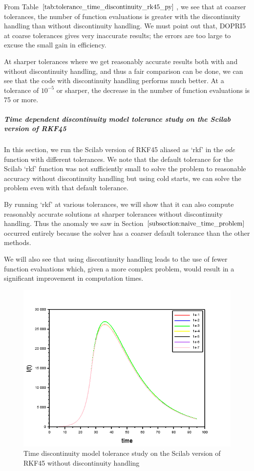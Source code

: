 From Table $\ref{tab:tolerance_time_discontinuity_rk45_py}$, we see that at coarser tolerances, the number of function evaluations is greater with the discontinuity handling than without discontinuity handling. We must point out that, DOPRI5 at coarse tolerances gives very inaccurate results; the errors are too large to excuse the small gain in efficiency.

At sharper tolerances where we get reasonably accurate results both with and without discontinuity handling, and thus a fair comparison can be done, we can see that the code with discontinuity handling performs much better. At a tolerance of $10^{-5}$ or sharper, the decrease in the number of function evaluations is 75 or more.

\subparagraph{Time dependent discontinuity model tolerance study on the Scilab version of RKF45}
In this section, we run the Scilab version of RKF45 aliased as `rkf' in the $ode$ function with different tolerances. We note that the default tolerance for the Scilab `rkf' function was not sufficiently small to solve the problem to reasonable accuracy without discontinuity handling but using cold starts, we can solve the problem even with that default tolerance. 

By running `rkf' at various tolerances, we will show that it can also compute reasonably accurate solutions at sharper tolerances without discontinuity handling. Thus the anomaly we saw in Section $\ref{subsection:naive_time_problem}$ occurred entirely because the solver has a coarser default tolerance than the other methods.

We will also see that using discontinuity handling leads to the use of fewer function evaluations which, given a more complex problem, would result in a significant improvement in computation times.

\begin{figure}[H]
\centering
\includegraphics[width=0.7\linewidth]{./figures/tolerance_time_rk45_no_event_sci}
\caption{Time discontinuity model tolerance study on the Scilab version of RKF45 without discontinuity handling}
\label{fig:tolerance_time_rk45_no_event_sci}
\end{figure}

